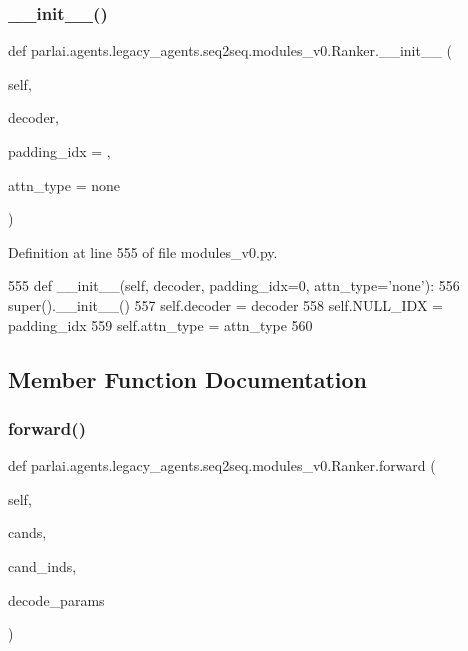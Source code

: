 \subsubsection{\texorpdfstring{\+\_\+\+\_\+init\+\_\+\+\_\+()}{\_\_init\_\_()}}
{\footnotesize\ttfamily def parlai.\+agents.\+legacy\+\_\+agents.\+seq2seq.\+modules\+\_\+v0.\+Ranker.\+\_\+\+\_\+init\+\_\+\+\_\+ (\begin{DoxyParamCaption}\item[{}]{self,  }\item[{}]{decoder,  }\item[{}]{padding\+\_\+idx = {},  }\item[{}]{attn\+\_\+type = {\ttfamily \textquotesingle{}none\textquotesingle{}} }\end{DoxyParamCaption})}



Definition at line 555 of file modules\+\_\+v0.\+py.


\begin{DoxyCode}
555     \textcolor{keyword}{def }\_\_init\_\_(self, decoder, padding\_idx=0, attn\_type='none'):
556         super().\_\_init\_\_()
557         self.decoder = decoder
558         self.NULL\_IDX = padding\_idx
559         self.attn\_type = attn\_type
560 
\end{DoxyCode}


\subsection{Member Function Documentation}
\mbox{\label{classparlai_1_1agents_1_1legacy__agents_1_1seq2seq_1_1modules__v0_1_1Ranker_a48177b131d765ebd734d25f962c44f55}} 
\subsubsection{\texorpdfstring{forward()}{forward()}}
{\footnotesize\ttfamily def parlai.\+agents.\+legacy\+\_\+agents.\+seq2seq.\+modules\+\_\+v0.\+Ranker.\+forward (\begin{DoxyParamCaption}\item[{}]{self,  }\item[{}]{cands,  }\item[{}]{cand\+\_\+inds,  }\item[{}]{decode\+\_\+params }\end{DoxyParamCaption})}



